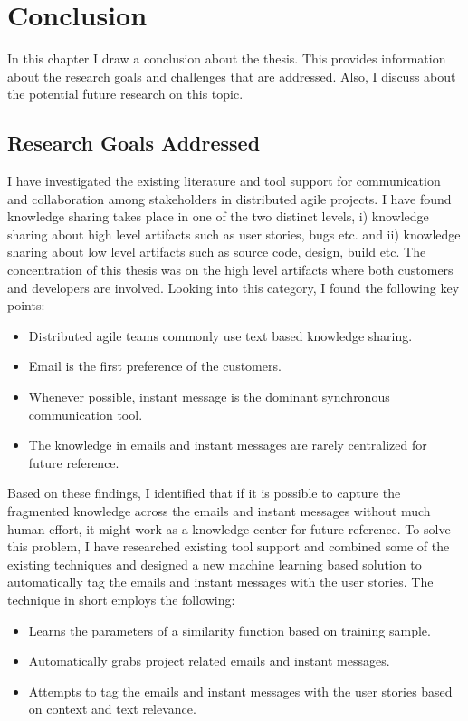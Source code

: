 \fancyhead[RO,LE]{\thepage}
\fancyfoot{} 
\chapter{Conclusion} 
In this chapter I draw a conclusion about the thesis. This provides information about the research goals and challenges that are addressed. Also, I discuss about the potential future research on this topic.

\section{Research Goals Addressed}
I have investigated the existing literature and tool support for communication and collaboration among stakeholders in distributed agile projects. I have found knowledge sharing takes place in one of the two distinct levels, i) knowledge sharing about high level artifacts such as user stories, bugs etc. and ii) knowledge sharing about low level artifacts such as source code, design, build etc. The concentration of this thesis was on the high level artifacts where both customers and developers are involved. Looking into this category, I found the following key points:
\begin{itemize}
	\item Distributed agile teams commonly use text based knowledge sharing.
	\item Email is the first preference of the customers.
	\item Whenever possible, instant message is the dominant synchronous communication tool.	
	\item The knowledge in emails and instant messages are rarely centralized for future reference.
\end{itemize}

Based on these findings, I identified that if it is possible to capture the fragmented knowledge across the emails and instant messages without much human effort, it might work as a knowledge center for future reference. To solve this problem, I have researched existing tool support and combined some of the existing techniques and designed a new machine learning based solution to automatically tag the emails and instant messages with the user stories. The technique in short employs the following:
\begin{itemize}
	\item Learns the parameters of a similarity function based on training sample.
	\item Automatically grabs project related emails and instant messages.
	\item Attempts to tag the emails and instant messages with the user stories based on context and text relevance.
\end{itemize}

